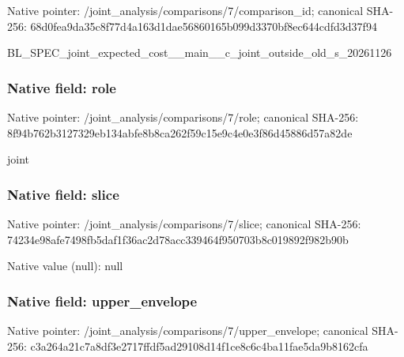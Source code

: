 \documentclass[10pt,a4paper]{article}
\begin{document}
Native pointer: /joint\_analysis/comparis\allowbreak{}ons/7/comparison\_id; canonical SHA-256: 68d0fea9da35c8f77d4a163d\allowbreak{}1dae56860165b099d3370bf8\allowbreak{}ec644cdfd3d37f94


BL\_SPEC\_joint\_expected\_c\allowbreak{}ost\_\_main\_\_c\_joint\_outsi\allowbreak{}de\_old\_s\_20261126


\subsubsection{Native field: role}


Native pointer: /joint\_analysis/comparisons/7/role; canonical SHA-256: 8f94b762b3127329eb134abf\allowbreak{}e8b8ca262f59c15e9c4e0e3f\allowbreak{}86d45886d57a82de


joint


\subsubsection{Native field: slice}


Native pointer: /joint\_analysis/comparisons/7/slice; canonical SHA-256: 74234e98afe7498fb5daf1f3\allowbreak{}6ac2d78acc339464f950703b\allowbreak{}8c019892f982b90b



Native value (null): null



\subsubsection{Native field: upper\_envelope}


Native pointer: /joint\_analysis/comparis\allowbreak{}ons/7/upper\_envelope; canonical SHA-256: c3a264a21c7a8df3e2717ffd\allowbreak{}f5ad29108d14f1ce8c6c4ba1\allowbreak{}1fae5da9b8162cfa
\end{document}
